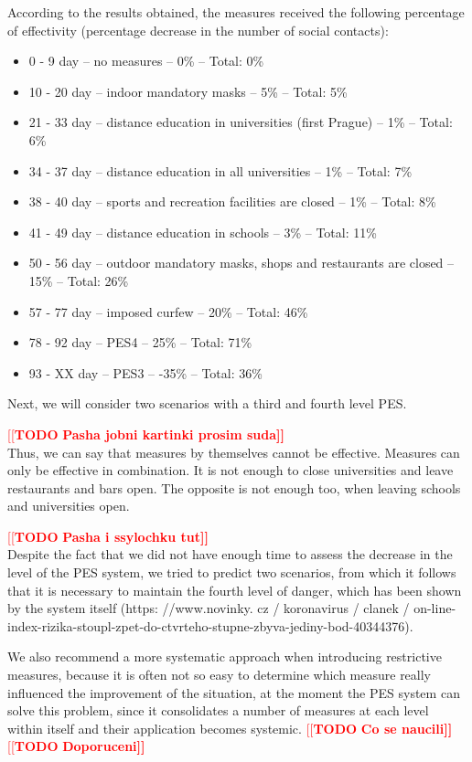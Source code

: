 \documentclass[12pt,a4paper,english]{article}
\newcommand{\todo}[1]{\noindent\textcolor{red}{[[\textbf{TODO} \textbf{#1]]}}\\}
\begin{document}
    According to the results obtained, the measures received the following percentage of effectivity (percentage decrease in the number of social contacts):
    \begin{itemize}
        \item 0 - 9   day -- no measures -- 0\% -- Total: 0\% 
        \item 10 - 20 day -- indoor mandatory  masks -- 5\% -- Total: 5\% 
        \item 21 - 33 day -- distance education in universities (first Prague) -- 1\% -- Total: 6\%
        \item 34 - 37 day -- distance education in all universities -- 1\% -- Total: 7\%
        \item 38 - 40 day -- sports and recreation facilities are closed -- 1\% -- Total: 8\%
        \item 41 - 49 day -- distance education in schools -- 3\% -- Total: 11\%
        \item 50 - 56 day -- outdoor mandatory masks, shops and restaurants are closed -- 15\% -- Total: 26\%
        \item 57 - 77 day -- imposed curfew -- 20\% -- Total: 46\%
        \item 78 - 92 day -- PES4 -- 25\% -- Total: 71\%
        \item 93 - XX day -- PES3 -- -35\% -- Total: 36\%
    \end{itemize}
    
    Next, we will consider two scenarios with a third and fourth level PES.
    
    \todo{Pasha jobni kartinki prosim suda}
    
    Thus, we can say that measures by themselves cannot be effective. Measures can only be effective in combination. It is not enough to close universities and leave restaurants and bars open. The opposite is not enough too, when leaving schools and universities open.
    
     \todo{Pasha i ssylochku tut}
     
    Despite the fact that we did not have enough time to assess the decrease in the level of the PES system, we tried to predict two scenarios, from which it follows that it is necessary to maintain the fourth level of danger, which has been shown by the system itself (https: //www.novinky. cz / koronavirus / clanek / on-line-index-rizika-stoupl-zpet-do-ctvrteho-stupne-zbyva-jediny-bod-40344376).
    
    We also recommend a more systematic approach when introducing restrictive measures, 
    because it is often not so easy to determine which measure really influenced the improvement of the situation,
    at the moment the PES system can solve this problem, since it consolidates a number of measures at each level within itself and their application becomes systemic.
    \todo{Co se naucili}
    \todo{Doporuceni}    

    \clearpage
    \nocite{*}
	
	
\end{document}
